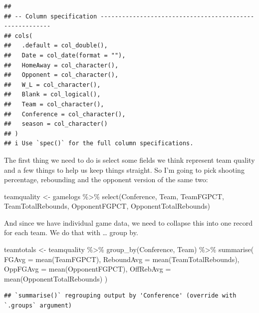 \documentclass[
]{book}
\newenvironment{Shaded}{\begin{snugshade}}{\end{snugshade}}
\newcommand{\AttributeTok}[1]{\textcolor[rgb]{0.77,0.63,0.00}{#1}}
\newcommand{\FunctionTok}[1]{\textcolor[rgb]{0.00,0.00,0.00}{#1}}
\newcommand{\NormalTok}[1]{#1}
\newcommand{\OtherTok}[1]{\textcolor[rgb]{0.56,0.35,0.01}{#1}}
\newcommand{\SpecialCharTok}[1]{\textcolor[rgb]{0.00,0.00,0.00}{#1}}
\begin{document}
\begin{verbatim}
## 
## -- Column specification --------------------------------------------------------
## cols(
##   .default = col_double(),
##   Date = col_date(format = ""),
##   HomeAway = col_character(),
##   Opponent = col_character(),
##   W_L = col_character(),
##   Blank = col_logical(),
##   Team = col_character(),
##   Conference = col_character(),
##   season = col_character()
## )
## i Use `spec()` for the full column specifications.
\end{verbatim}

The first thing we need to do is select some fields we think represent team quality and a few things to help us keep things straight. So I'm going to pick shooting percentage, rebounding and the opponent version of the same two:

\begin{Shaded}
\begin{Highlighting}[]
\NormalTok{teamquality }\OtherTok{\textless{}{-}}\NormalTok{ gamelogs }\SpecialCharTok{\%\textgreater{}\%} 
  \FunctionTok{select}\NormalTok{(Conference, Team, TeamFGPCT, TeamTotalRebounds, OpponentFGPCT, OpponentTotalRebounds)}
\end{Highlighting}
\end{Shaded}

And since we have individual game data, we need to collapse this into one record for each team. We do that with \ldots{} group by.

\begin{Shaded}
\begin{Highlighting}[]
\NormalTok{teamtotals }\OtherTok{\textless{}{-}}\NormalTok{ teamquality }\SpecialCharTok{\%\textgreater{}\%} 
  \FunctionTok{group\_by}\NormalTok{(Conference, Team) }\SpecialCharTok{\%\textgreater{}\%} 
  \FunctionTok{summarise}\NormalTok{(}
    \AttributeTok{FGAvg =} \FunctionTok{mean}\NormalTok{(TeamFGPCT), }
    \AttributeTok{ReboundAvg =} \FunctionTok{mean}\NormalTok{(TeamTotalRebounds), }
    \AttributeTok{OppFGAvg =} \FunctionTok{mean}\NormalTok{(OpponentFGPCT),}
    \AttributeTok{OffRebAvg =} \FunctionTok{mean}\NormalTok{(OpponentTotalRebounds)}
\NormalTok{    ) }
\end{Highlighting}
\end{Shaded}

\begin{verbatim}
## `summarise()` regrouping output by 'Conference' (override with `.groups` argument)
\end{verbatim}
\end{document}

